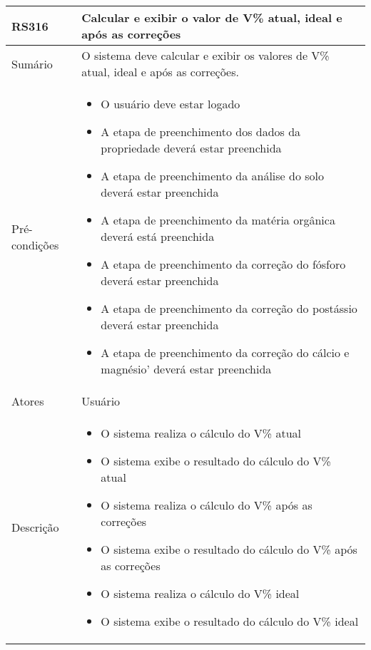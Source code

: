 \begin{quadro}[H]
    \begin{tabular}{|p{3cm}|p{11cm}|}
        \hline
        \textbf{RS316} & \textbf{Calcular e exibir o valor de V\% atual, ideal e após as correções}           \\
        \hline
        Sumário        & O sistema deve calcular e exibir os valores de V\% atual, ideal e após as correções. \\
        \hline
        Pré-condições  & \begin{itemize}
            \item O usuário deve estar logado
            \item A etapa de preenchimento dos dados da propriedade deverá estar preenchida
            \item A etapa de preenchimento da análise do solo deverá estar preenchida
            \item A etapa de preenchimento da matéria orgânica deverá está preenchida
            \item A etapa de preenchimento da correção do fósforo deverá estar preenchida
            \item A etapa de preenchimento da correção do postássio deverá estar preenchida
            \item A etapa de preenchimento da correção do cálcio e magnésio' deverá estar preenchida
        \end{itemize}                                                           \\
        \hline
        Atores         & Usuário                                                                              \\
        \hline
        Descrição      &
        \begin{itemize}
            \item O sistema realiza o cálculo do V\% atual
            \item O sistema exibe o resultado do cálculo do V\% atual
            \item O sistema realiza o cálculo do V\% após as correções
            \item O sistema exibe o resultado do cálculo do V\% após as correções
            \item O sistema realiza o cálculo do V\% ideal
            \item O sistema exibe o resultado do cálculo do V\% ideal
        \end{itemize}                                                                            \\

\end{tabular}
\end{quadro}
